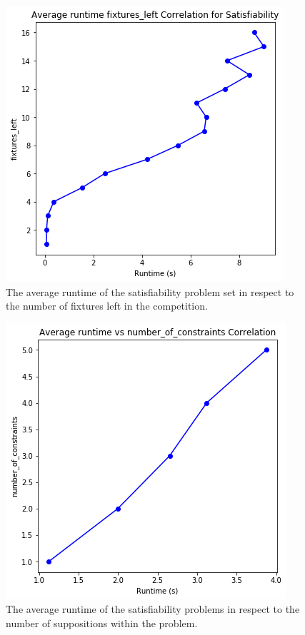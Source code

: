 \documentclass{article}
\begin{document}
	\begin{figure}
		\centering
		\includegraphics[width=0.7\linewidth]{graphs/LR/rt-fix_left-LR}
		\caption{The average runtime of the satisfiability problem set in respect to the number of fixtures left in the competition.}
		\label{fig:rt-fixleft-lr}
	\end{figure}
	\begin{figure}
		\centering
		\includegraphics[width=0.7\linewidth]{graphs/LR/rt-num_const-LR}
		\caption{The average runtime of the satisfiability problems in respect to the number of suppositions within the problem.}
		\label{fig:rt-numconst-lr}
	\end{figure}
\end{document}
